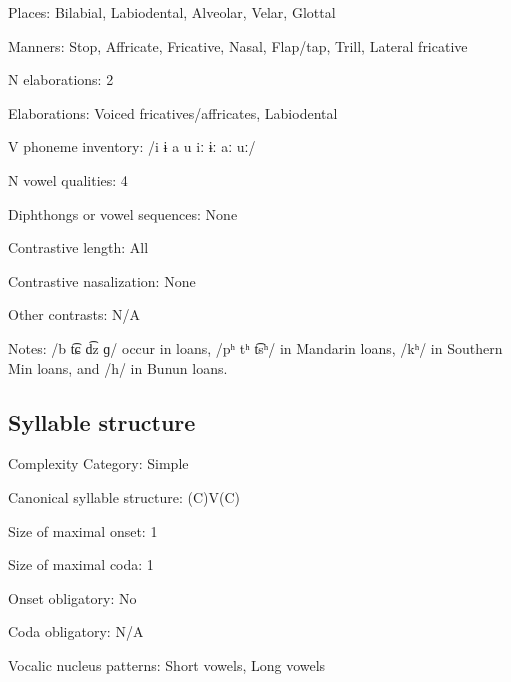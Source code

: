 {\begin{appendixdesc}
\item[Places:] Bilabial, Labiodental, Alveolar, Velar, Glottal

\item[Manners:] Stop, Affricate, Fricative, Nasal, Flap/tap, Trill, Lateral fricative

\item[N elaborations:] 2

\item[Elaborations:] Voiced fricatives/affricates, Labiodental

\item[V phoneme inventory:] /i ɨ a u iː ɨː aː uː/

\item[N vowel qualities:] 4

\item[Diphthongs or vowel sequences:] None

\item[Contrastive length:] All

\item[Contrastive nasalization:] None

\item[Other contrasts:] N/A

\item[Notes:] /b t͡ɕ d͡z ɡ/ occur in  loans, /pʰ tʰ t͡sʰ/ in Mandarin loans, /kʰ/ in Southern Min loans, and /h/ in Bunun loans.
\end{appendixdesc}
\subsection*{Syllable structure}
\begin{appendixdesc}

\item[Complexity Category:] Simple

\item[Canonical syllable structure:] (C)V(C) \citep[32--33]{Pan2012}

\item[Size of maximal onset:] 1

\item[Size of maximal coda:] 1

\item[Onset obligatory:] No

\item[Coda obligatory:] N/A

\item[Vocalic nucleus patterns:] Short vowels, Long vowels


\end{appendixdesc}}
